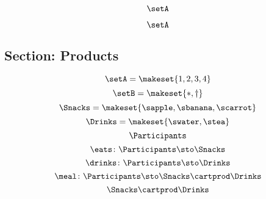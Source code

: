 {\begin{forslides}
        \begin{equation}
            \label{eq:combination-188}
            \setA
        \end{equation}

        \begin{equation}
            \label{eq:combination-189}
            \setA
        \end{equation}

        \subsection{Section: Products}

        \begin{equation}
            \label{eq:prod-slides-1}
            \setA = \makeset{1, 2, 3, 4}
        \end{equation}
        \begin{equation}
            \label{eq:prod-slides-2}
            \setB = \makeset{ \ast, \dagger }
        \end{equation}
        \begin{equation}
            \label{eq:prod-slides-3}
            \Snacks=\makeset{\sapple,\sbanana,\scarrot}
        \end{equation}
        \begin{equation}
            \label{eq:prod-slides-4}
            \Drinks=\makeset{\swater,\stea}
        \end{equation}
        \begin{equation}
            \label{eq:prod-slides-5}
            \Participants
        \end{equation}
        \begin{equation}
            \label{eq:prod-slides-6}
            \eats \colon \Participants \sto \Snacks
        \end{equation}
        \begin{equation}
            \label{eq:prod-slides-7}
            \drinks \colon  \Participants \sto \Drinks
        \end{equation}
        \begin{equation}
            \label{eq:prod-slides-8}
            \meal \colon \Participants\sto \Snacks \cartprod \Drinks
        \end{equation}
        \begin{equation}
            \label{eq:prod-slides-9}
            \Snacks \cartprod \Drinks

\end{equation}
\end{forslides}}
